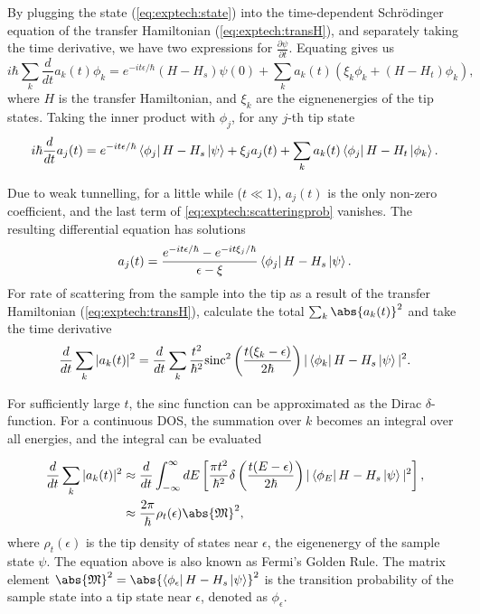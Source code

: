 By plugging the state (\autoref{eq:exptech:state}) into the time-dependent Schr\"odinger equation of the transfer Hamiltonian (\autoref{eq:exptech:transH}), and separately taking the time derivative, we have two expressions for $\frac{\partial \psi}{\partial t}$. Equating gives us
\begin{equation}
i\hbar \sum_k \frac{d}{dt} a_k(t) \phi_k = e^{-it\epsilon / \hbar} (H-H_{s})\psi(0) + \sum_k a_k(t) (\xi_k \phi_k + (H-H_{t})\phi_k),
\end{equation}
where $H$ is the transfer Hamiltonian, and $\xi_k$ are the eignenenergies of the tip states. Taking the inner product with $\phi_j$, for any $j$-th tip state
\begin{equation} \label{eq:exptech:scatteringprob}
i\hbar \frac{d}{dt} a_j(t) = e^{-it\epsilon/\hbar} \Bra{\phi_j}H-H_{s} \Ket{\psi} + \xi_j a_j(t) + \sum_k a_k(t) \Bra{\phi_j} H - H_{t} \Ket{\phi_k}.
\end{equation}

Due to weak tunnelling, for a little while ($t \ll 1$), $a_j(t)$ is the only non-zero coefficient, and the last term of \autoref{eq:exptech:scatteringprob} vanishes. The resulting differential equation has solutions
\begin{equation}
a_j(t) =  \frac{e^{-it\epsilon/\hbar} - e^{-it\xi_j/\hbar}}{\epsilon - \xi}  \Bra{\phi_j} H-H_{s} \Ket{\psi}.
\end{equation}
For rate of scattering from the sample into the tip as a result of the transfer Hamiltonian (\autoref{eq:exptech:transH}), calculate the total $\sum_k \abs{a_k(t)}^2$ and take the time derivative
\begin{equation}
\frac{d}{dt}\sum_k |a_k(t)|^2 = \frac{d}{dt}  \sum_k \frac{t^2}{\hbar^2}\textrm{sinc}^2 \left(\frac{t(\xi_k - \epsilon)}{2\hbar} \right) | \Bra{\phi_k} H-H_{s} \Ket{\psi}  | ^2.
\end{equation}

For sufficiently large $t$, the sinc function can be approximated as the Dirac $\delta$-function. For a continuous \ac{DOS}, the summation over $k$ becomes an integral over all energies, and the integral can be evaluated

\begin{align}
\frac{d}{dt}\sum_k |a_k(t)|^2 &\approx  \frac{d}{dt}  \int_{-\infty}^\infty dE \left[ \frac{\pi t^2}{\hbar^2} \delta \left(\frac{t(E - \epsilon)}{2\hbar} \right) | \Bra{\phi_E} H-H_{s} \Ket{\psi}  | ^2 \right], \\
&\approx  \frac{2\pi }{\hbar} \rho_t(\epsilon) \abs{\mathfrak{M}}^2,
\end{align}
where $\rho_t(\epsilon)$ is the tip density of states near $\epsilon$, the eigenenergy of the sample state $\psi$. The equation above is also known as Fermi's Golden Rule. The matrix element $\abs{\mathfrak{M}}^2 = \abs{\Bra{\phi_\epsilon} H - H_s \Ket{\psi}}^2$ is the transition probability of the sample state into a tip state near $\epsilon$, denoted as $\phi_\epsilon$.

